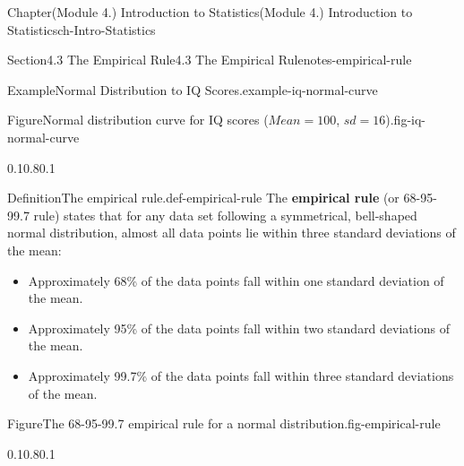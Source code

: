 \documentclass[oneside,10pt,]{book}
\newcommand{\ptxlistdisc}{\raisebox{0.3ex}{\textbullet}}
\newcommand{\terminology}[1]{\textbf{#1}}
\begin{document}
\begin{chapterptx}{Chapter}{(Module 4.) Introduction to Statistics}{}{(Module 4.) Introduction to Statistics}{}{}{ch-Intro-Statistics}
\begin{sectionptx}{Section}{4.3 The Empirical Rule}{}{4.3 The Empirical Rule}{}{}{notes-empirical-rule}
\begin{example}{Example}{Normal Distribution to IQ Scores.}{example-iq-normal-curve}
\begin{figureptx}{Figure}{Normal distribution curve for IQ scores (\(Mean = 100\), \(sd = 16\)).}{fig-iq-normal-curve}{}
\begin{image}{0.1}{0.8}{0.1}{}
{%
}%
\end{image}%
\tcblower
\end{figureptx}%
\end{example}
\begin{definition}{Definition}{The empirical rule.}{def-empirical-rule}%
The \terminology{empirical rule} (or 68-95-99.7 rule) states that for any data set following a symmetrical, bell-shaped normal distribution, almost all data points lie within three standard deviations of the mean:%
\par
%
\begin{itemize}[label=\ptxlistdisc]
\item{}Approximately 68\% of the data points fall within one standard deviation of the mean.%
\item{}Approximately 95\% of the data points fall within two standard deviations of the mean.%
\item{}Approximately 99.7\% of the data points fall within three standard deviations of the mean.%
\end{itemize}
%
\end{definition}
\begin{figureptx}{Figure}{The 68-95-99.7 empirical rule for a normal distribution.}{fig-empirical-rule}{}%
\begin{image}{0.1}{0.8}{0.1}{}%
\end{image}
\end{figureptx}
\end{sectionptx}
\end{chapterptx}
\end{document}
